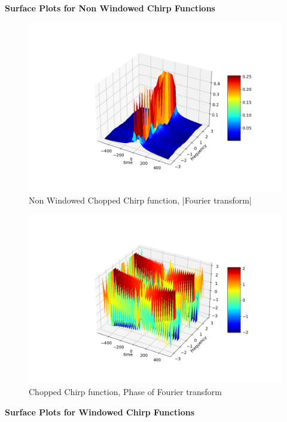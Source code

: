 \documentclass{article}
\begin{document}
\noindent
\textbf{
Surface Plots for Non Windowed Chirp Functions}

\begin{figure}[!tbh]
\centering
\includegraphics[scale=0.4]{plots/non_windowed_surfacemag.png}
\caption{Non Windowed Chopped Chirp function, |Fourier transform|}
\label{fig:14}
\end{figure}

\begin{figure}[!tbh]
\centering
\includegraphics[scale=0.4]{plots/non_windowed_surfaceangles.png}
\caption{Chopped Chirp function, Phase of Fourier transform}
\label{fig:15}
\end{figure}
\newpage

\noindent
\textbf{
Surface Plots for Windowed Chirp Functions}
\end{document}
